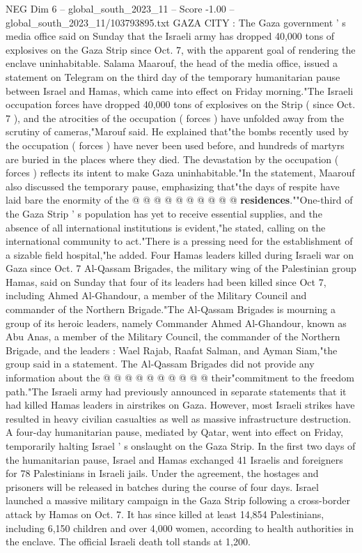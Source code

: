 \begin{textsample}{NEG Dim 6 – global\_south\_2023\_11 – Score -1.00 – global\_south\_2023\_11/103793895.txt}  \label{ex:f6_neg_149}
GAZA CITY : The Gaza government ' s media office said on Sunday that the Israeli army has dropped 40,000 tons of explosives on the Gaza Strip since Oct. 7, with the apparent goal of rendering the enclave uninhabitable.
Salama Maarouf, the head of the media office, issued a statement on Telegram on the third day of the temporary humanitarian pause between Israel and Hamas, which came into effect on Friday morning."The Israeli occupation forces have dropped 40,000 tons of explosives on the Strip ( since Oct. 7 ), and the atrocities of the occupation ( forces ) have unfolded away from the scrutiny of cameras,"Marouf said.
He explained that"the bombs recently used by the occupation ( forces ) have never been used before, and hundreds of martyrs are buried in the places where they died.
The devastation by the occupation ( forces ) reflects its intent to make Gaza uninhabitable."In the statement, Maarouf also discussed the temporary pause, emphasizing that"the days of respite have laid bare the enormity of the @ @ @ @ @ @ @ @ @ @ \textbf{residences}.""One-third of the Gaza Strip ' s population has yet to receive essential supplies, and the absence of all international institutions is evident,"he stated, calling on the international community to act."There is a pressing need for the establishment of a sizable field hospital,"he added.
Four Hamas leaders killed during Israeli war on Gaza since Oct. 7 Al-Qassam Brigades, the military wing of the Palestinian group Hamas, said on Sunday that four of its leaders had been killed since Oct 7, including Ahmed Al-Ghandour, a member of the Military Council and commander of the Northern Brigade."The Al-Qassam Brigades is mourning a group of its heroic leaders, namely Commander Ahmed Al-Ghandour, known as Abu Anas, a member of the Military Council, the commander of the Northern Brigade, and the leaders : Wael Rajab, Raafat Salman, and Ayman Siam,"the group said in a statement.
The Al-Qassam Brigades did not provide any information about the @ @ @ @ @ @ @ @ @ @ their"commitment to the freedom path."The Israeli army had previously announced in separate statements that it had killed Hamas leaders in airstrikes on Gaza.
However, most Israeli strikes have resulted in heavy civilian casualties as well as massive infrastructure destruction.
A four-day humanitarian pause, mediated by Qatar, went into effect on Friday, temporarily halting Israel ' s onslaught on the Gaza Strip.
In the first two days of the humanitarian pause, Israel and Hamas exchanged 41 Israelis and foreigners for 78 Palestinians in Israeli jails.
Under the agreement, the hostages and prisoners will be released in batches during the course of four days.
Israel launched a massive military campaign in the Gaza Strip following a cross-border attack by Hamas on Oct. 7.
It has since killed at least 14,854 Palestinians, including 6,150 children and over 4,000 women, according to health authorities in the enclave.
The official Israeli death toll stands at 1,200.

\end{textsample}
